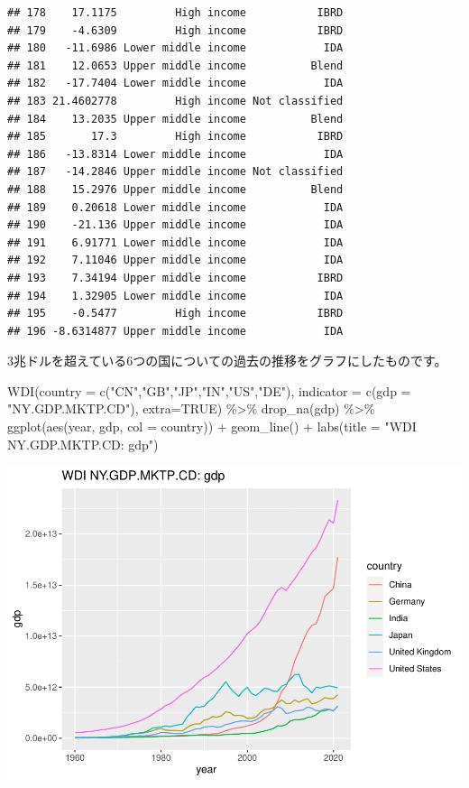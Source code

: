 \documentclass[
]{article}
\newenvironment{Shaded}{\begin{snugshade}}{\end{snugshade}}
\newcommand{\AttributeTok}[1]{\textcolor[rgb]{0.77,0.63,0.00}{#1}}
\newcommand{\ConstantTok}[1]{\textcolor[rgb]{0.00,0.00,0.00}{#1}}
\newcommand{\FunctionTok}[1]{\textcolor[rgb]{0.00,0.00,0.00}{#1}}
\newcommand{\NormalTok}[1]{#1}
\newcommand{\SpecialCharTok}[1]{\textcolor[rgb]{0.00,0.00,0.00}{#1}}
\newcommand{\StringTok}[1]{\textcolor[rgb]{0.31,0.60,0.02}{#1}}
\begin{document}
\begin{verbatim}
## 178    17.1175         High income           IBRD
## 179    -4.6309         High income           IBRD
## 180   -11.6986 Lower middle income            IDA
## 181    12.0653 Upper middle income          Blend
## 182   -17.7404 Lower middle income            IDA
## 183 21.4602778         High income Not classified
## 184    13.2035 Upper middle income          Blend
## 185       17.3         High income           IBRD
## 186   -13.8314 Lower middle income            IDA
## 187   -14.2846 Upper middle income Not classified
## 188    15.2976 Upper middle income          Blend
## 189    0.20618 Lower middle income            IDA
## 190    -21.136 Upper middle income            IDA
## 191    6.91771 Lower middle income            IDA
## 192    7.11046 Upper middle income            IDA
## 193    7.34194 Upper middle income           IBRD
## 194    1.32905 Lower middle income            IDA
## 195    -0.5477         High income           IBRD
## 196 -8.6314877 Upper middle income            IDA
\end{verbatim}

3兆ドルを超えている6つの国についての過去の推移をグラフにしたものです。

\begin{Shaded}
\begin{Highlighting}[]
\FunctionTok{WDI}\NormalTok{(}\AttributeTok{country =} \FunctionTok{c}\NormalTok{(}\StringTok{"CN"}\NormalTok{,}\StringTok{"GB"}\NormalTok{,}\StringTok{"JP"}\NormalTok{,}\StringTok{"IN"}\NormalTok{,}\StringTok{"US"}\NormalTok{,}\StringTok{"DE"}\NormalTok{), }\AttributeTok{indicator =} \FunctionTok{c}\NormalTok{(}\AttributeTok{gdp =} \StringTok{"NY.GDP.MKTP.CD"}\NormalTok{), }\AttributeTok{extra=}\ConstantTok{TRUE}\NormalTok{) }\SpecialCharTok{\%\textgreater{}\%} \FunctionTok{drop\_na}\NormalTok{(gdp) }\SpecialCharTok{\%\textgreater{}\%} 
  \FunctionTok{ggplot}\NormalTok{(}\FunctionTok{aes}\NormalTok{(year, gdp, }\AttributeTok{col =}\NormalTok{ country)) }\SpecialCharTok{+} \FunctionTok{geom\_line}\NormalTok{() }\SpecialCharTok{+}
  \FunctionTok{labs}\NormalTok{(}\AttributeTok{title =} \StringTok{"WDI NY.GDP.MKTP.CD: gdp"}\NormalTok{)}
\end{Highlighting}
\end{Shaded}

\includegraphics{intro2rj-short_files/figure-latex/unnamed-chunk-13-1.pdf}
\end{document}
